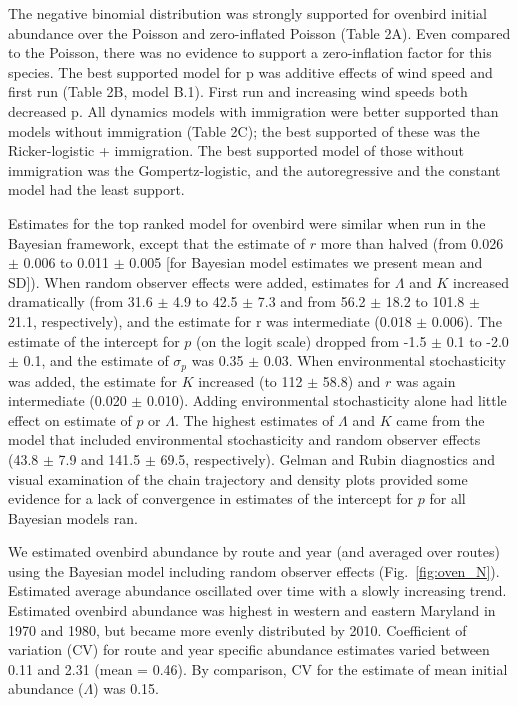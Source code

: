 \documentclass[12pt]{article}
\begin{document}
The negative binomial distribution was strongly supported for ovenbird
initial abundance over the Poisson and zero-inflated Poisson
(Table 2A). Even compared to the Poisson, there was
no evidence to support a zero-inflation factor for this species.
The best supported model for p was additive effects of wind speed
and first run (Table 2B, model B.1). First run and increasing wind
speeds both decreased p. All dynamics models with immigration were
better supported than models without immigration (Table 2C); 
the best supported of these was the Ricker-logistic + immigration.
The best supported model of those without immigration was the
Gompertz-logistic, and the autoregressive and the constant model had the least
support.

Estimates for the top ranked model for ovenbird
were similar when
run in the Bayesian framework, except that the estimate of $r$
more than halved (from 0.026 $\pm$ 0.006 to 0.011 $\pm$ 0.005 [for
Bayesian model estimates we present mean and SD]). When random observer effects
were added, estimates for $\Lambda$ and $K$ increased dramatically
(from 31.6 $\pm$ 4.9 to 42.5 $\pm$ 7.3 and from 56.2 $\pm$ 18.2 to 101.8 $\pm$ 21.1,
respectively), and the estimate for r was intermediate (0.018 $\pm$ 0.006). The
estimate of the intercept for $p$ (on the logit scale) dropped from -1.5 $\pm$
0.1 to -2.0 $\pm$ 0.1, and the estimate of $\sigma_p$ was 0.35 $\pm$ 0.03.  When
environmental stochasticity was added, the estimate for $K$ increased (to 112 $\pm$ 58.8) and $r$ was
again intermediate (0.020 $\pm$ 0.010).  Adding environmental stochasticity alone had little effect
on estimate of $p$ or $\Lambda$. The highest estimates of $\Lambda$ and $K$ came 
from the model that included environmental stochasticity and random observer effects (43.8 $\pm$
7.9 and 141.5 $\pm$ 69.5, respectively).  
Gelman and Rubin diagnostics and visual examination of the chain trajectory and density plots
provided some evidence for a lack of convergence in estimates of the
intercept for $p$ for all Bayesian models ran.  

We estimated ovenbird abundance by route and year (and averaged over routes) 
using the Bayesian model including random observer effects (Fig.~\ref{fig:oven_N}).  
Estimated average abundance oscillated over time with a slowly increasing trend.  Estimated ovenbird
abundance was highest in western and eastern Maryland in 1970 and 1980, but became
more evenly distributed by 2010.  Coefficient of variation (CV) for route and year specific
abundance estimates varied between 0.11 and 2.31 (mean = 0.46).  By comparison, CV
for the estimate of mean initial abundance ($\Lambda$) was 0.15.
\end{document}
